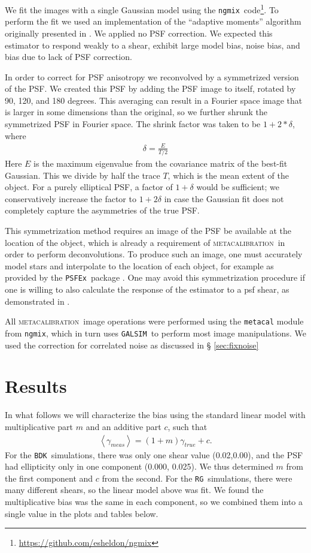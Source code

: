 \documentclass[iop]{emulateapj}
\newcommand{\mcal}{\textsc{metacalibration}}
\newcommand{\psfex}{\texttt{PSFEx}}
\newcommand{\nsimShear}{0.02,0.00}
\newcommand{\ngmix}{\texttt{ngmix}}
\newcommand{\bdksim}{\texttt{BDK}}
\newcommand{\rgsim}{\texttt{RG}}
\newcommand{\galsim}{\texttt{GALSIM}}
\begin{document}
We fit the images with a single Gaussian model using the \ngmix\
code\footnote{\url{https://github.com/esheldon/ngmix}}.  To perform the fit we used an
implementation of the ``adaptive moments'' algorithm originally presented in
\cite{bj02}.   We applied no PSF correction.  We expected this estimator to
respond weakly to a shear, exhibit large model bias, noise bias, and bias
due to lack of PSF correction.

In order to correct for PSF anisotropy  we reconvolved by a symmetrized version
of the PSF. We created this PSF by adding the PSF image to itself, rotated by
90, 120, and 180 degrees.  This averaging can result in a Fourier space image
that is larger in some dimensions than the original, so we further shrunk
the symmetrized PSF in Fourier space.  The shrink factor was taken to be
$1+2*\delta$, where
\begin{align}
    \delta = \frac{E}{T/2}
\end{align}
Here $E$ is the maximum eigenvalue from the covariance matrix of the best-fit
Gaussian. This we divide by half the trace $T$, which is the mean extent of the
object.  For a purely elliptical PSF, a factor of $1+\delta$ would be
sufficient; we conservatively increase the factor to $1+2\delta$ in case the
Gaussian fit does not completely capture the asymmetries of the true PSF.

This symmetrization method requires an image of the PSF be available at the
location of the object, which is already a requirement of \mcal\ in order to
perform deconvolutions.  To produce such an image, one must accurately model
stars and interpolate to the location of each object, for example as provided
by the \psfex\ package \citep{BertinPSFEx2011}.  One may avoid this
symmetrization procedure if one is willing to also calculate the response of
the estimator to a psf shear, as demonstrated in \citep{HuffMcal}.

All \mcal\ image operations were performed using the \texttt{metacal} module
from \ngmix, which in turn uses \galsim\ to perform most image manipulations.
We used the correction for correlated noise as discussed in \S
\ref{sec:fixnoise}


\section{Results} \label{sec:results}

In what follows we will characterize the bias using the standard linear model
\citep[e.g.][]{great3} with multiplicative part $m$ and an additive part $c$,
such that
\begin{align}
	\left< \gamma_{meas} \right> = (1+m) \gamma_{true} + c.
\end{align}
For the \bdksim\ simulations, there was only one shear value (\nsimShear),
and the PSF had ellipticity only in one component (0.000, 0.025). We
thus determined $m$ from the first component and $c$ from the
second.  For the \rgsim\ simulations, there were many different shears,
so the linear model above was fit.  We found the multiplicative
bias was the same in each component, so we combined them into
a single value in the plots and tables below.
\end{document}
